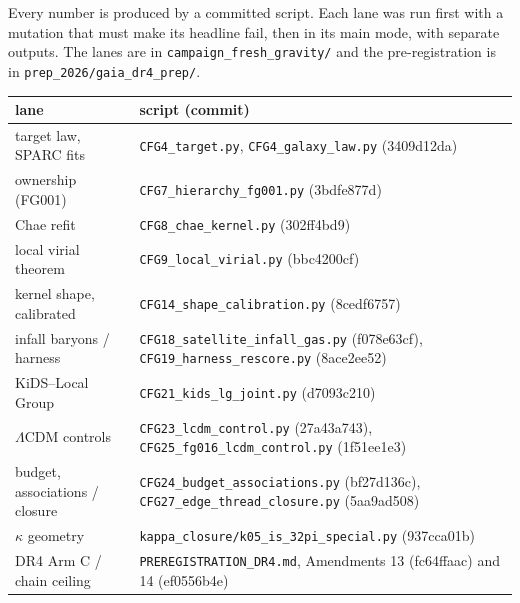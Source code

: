 \documentclass[10pt]{article}
\newcommand{\fpath}[1]{\nolinkurl{#1}}
\begin{document}
Every number is produced by a committed script. Each lane was run first with a mutation that must make its headline fail, then in its main mode, with separate outputs. The lanes are in \fpath{campaign_fresh_gravity/} and the pre-registration is in \fpath{prep_2026/gaia_dr4_prep/}.
\begin{center}\footnotesize
\begin{tabular}{@{}ll@{}}
\toprule
lane & script (commit)\\
\midrule
target law, SPARC fits & \fpath{CFG4_target.py}, \fpath{CFG4_galaxy_law.py} (3409d12da)\\
ownership (FG001) & \fpath{CFG7_hierarchy_fg001.py} (3bdfe877d)\\
Chae refit & \fpath{CFG8_chae_kernel.py} (302ff4bd9)\\
local virial theorem & \fpath{CFG9_local_virial.py} (bbc4200cf)\\
kernel shape, calibrated & \fpath{CFG14_shape_calibration.py} (8cedf6757)\\
infall baryons / harness & \fpath{CFG18_satellite_infall_gas.py} (f078e63cf), \fpath{CFG19_harness_rescore.py} (8ace2ee52)\\
KiDS--Local Group & \fpath{CFG21_kids_lg_joint.py} (d7093c210)\\
$\Lambda$CDM controls & \fpath{CFG23_lcdm_control.py} (27a43a743), \fpath{CFG25_fg016_lcdm_control.py} (1f51ee1e3)\\
budget, associations / closure & \fpath{CFG24_budget_associations.py} (bf27d136c), \fpath{CFG27_edge_thread_closure.py} (5aa9ad508)\\
$\kappa$ geometry & \fpath{kappa_closure/k05_is_32pi_special.py} (937cca01b)\\
DR4 Arm C / chain ceiling & \fpath{PREREGISTRATION_DR4.md}, Amendments 13 (fc64ffaac) and 14 (ef0556b4e)\\
\bottomrule
\end{tabular}
\end{center}
\end{document}

